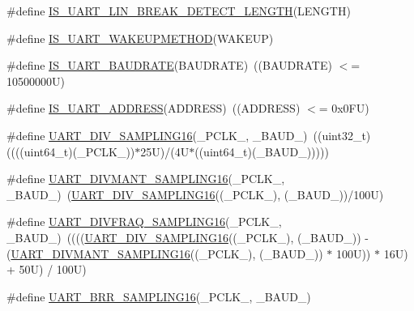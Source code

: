 \begin{DoxyCompactItemize}
\item 
\#define \hyperlink{group___u_a_r_t___private___macros_ga5f09f62c88629a872d9b6ebf1d068950}{I\+S\+\_\+\+U\+A\+R\+T\+\_\+\+L\+I\+N\+\_\+\+B\+R\+E\+A\+K\+\_\+\+D\+E\+T\+E\+C\+T\+\_\+\+L\+E\+N\+G\+TH}(L\+E\+N\+G\+TH)
\item 
\#define \hyperlink{group___u_a_r_t___private___macros_ga6fea268c66482e36fb38844b808cf695}{I\+S\+\_\+\+U\+A\+R\+T\+\_\+\+W\+A\+K\+E\+U\+P\+M\+E\+T\+H\+OD}(W\+A\+K\+E\+UP)
\item 
\#define \hyperlink{group___u_a_r_t___private___macros_ga5d657d5c8e47b147a834e0018e9407c2}{I\+S\+\_\+\+U\+A\+R\+T\+\_\+\+B\+A\+U\+D\+R\+A\+TE}(B\+A\+U\+D\+R\+A\+TE)~((B\+A\+U\+D\+R\+A\+TE) $<$= 10500000\+U)
\item 
\#define \hyperlink{group___u_a_r_t___private___macros_ga2c4dce8c60f202455e6f1481fc441f98}{I\+S\+\_\+\+U\+A\+R\+T\+\_\+\+A\+D\+D\+R\+E\+SS}(A\+D\+D\+R\+E\+SS)~((A\+D\+D\+R\+E\+SS) $<$= 0x0\+F\+U)
\item 
\#define \hyperlink{group___u_a_r_t___private___macros_gabd6dd99fff6cd5c0374780fd72a61e6e}{U\+A\+R\+T\+\_\+\+D\+I\+V\+\_\+\+S\+A\+M\+P\+L\+I\+N\+G16}(\+\_\+\+P\+C\+L\+K\+\_\+,  \+\_\+\+B\+A\+U\+D\+\_\+)~((uint32\+\_\+t)((((uint64\+\_\+t)(\+\_\+\+P\+C\+L\+K\+\_\+))$\ast$25\+U)/(4\+U$\ast$((uint64\+\_\+t)(\+\_\+\+B\+A\+U\+D\+\_\+)))))
\item 
\#define \hyperlink{group___u_a_r_t___private___macros_ga9cd479aff25c454d9d4f3c1c20517c86}{U\+A\+R\+T\+\_\+\+D\+I\+V\+M\+A\+N\+T\+\_\+\+S\+A\+M\+P\+L\+I\+N\+G16}(\+\_\+\+P\+C\+L\+K\+\_\+,  \+\_\+\+B\+A\+U\+D\+\_\+)~(\hyperlink{group___u_a_r_t___private___macros_gabd6dd99fff6cd5c0374780fd72a61e6e}{U\+A\+R\+T\+\_\+\+D\+I\+V\+\_\+\+S\+A\+M\+P\+L\+I\+N\+G16}((\+\_\+\+P\+C\+L\+K\+\_\+), (\+\_\+\+B\+A\+U\+D\+\_\+))/100\+U)
\item 
\#define \hyperlink{group___u_a_r_t___private___macros_gade99ebfd7502df11b366c48fac5417d7}{U\+A\+R\+T\+\_\+\+D\+I\+V\+F\+R\+A\+Q\+\_\+\+S\+A\+M\+P\+L\+I\+N\+G16}(\+\_\+\+P\+C\+L\+K\+\_\+,  \+\_\+\+B\+A\+U\+D\+\_\+)~((((\hyperlink{group___u_a_r_t___private___macros_gabd6dd99fff6cd5c0374780fd72a61e6e}{U\+A\+R\+T\+\_\+\+D\+I\+V\+\_\+\+S\+A\+M\+P\+L\+I\+N\+G16}((\+\_\+\+P\+C\+L\+K\+\_\+), (\+\_\+\+B\+A\+U\+D\+\_\+)) -\/ (\hyperlink{group___u_a_r_t___private___macros_ga9cd479aff25c454d9d4f3c1c20517c86}{U\+A\+R\+T\+\_\+\+D\+I\+V\+M\+A\+N\+T\+\_\+\+S\+A\+M\+P\+L\+I\+N\+G16}((\+\_\+\+P\+C\+L\+K\+\_\+), (\+\_\+\+B\+A\+U\+D\+\_\+)) $\ast$ 100\+U)) $\ast$ 16\+U) + 50\+U) / 100\+U)
\item 
\#define \hyperlink{group___u_a_r_t___private___macros_gaed98b14acfc939985cc9909a6fa64d71}{U\+A\+R\+T\+\_\+\+B\+R\+R\+\_\+\+S\+A\+M\+P\+L\+I\+N\+G16}(\+\_\+\+P\+C\+L\+K\+\_\+,  \+\_\+\+B\+A\+U\+D\+\_\+)

\end{DoxyCompactItemize}
